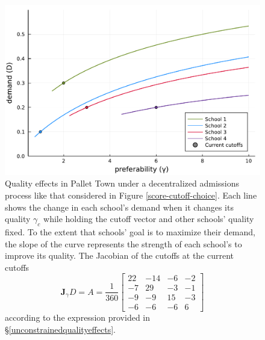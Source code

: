 \documentclass[12pt]{article}
\theoremstyle{definition}
\begin{document}
\begin{figure}
\begin{center}\includegraphics[width=\linewidth, ]{plots/vary-gamma-demand.pdf}\end{center}
\captionsetup{singlelinecheck=off}
    \caption[.]{Quality effects in Pallet Town under a decentralized admissions process like that considered in Figure \ref{score-cutoff-choice}. Each line shows the change in each school’s demand when it changes its quality $\gamma_c$ while holding the cutoff vector and other schools’ quality fixed. To the extent that schools’ goal is to maximize their demand, the slope of the curve represents the strength of each school’s to improve its quality. The Jacobian of the cutoffs at the current cutoffs
    \begin{equation*}
    \mathbf{J}_\gamma D = A = \frac{1}{360}
    \begin{bmatrix}
22 & -14 & -6&  -2\\
 -7   &29  &-3  &-1\\
 -9   &-9  &15  &-3\\
 -6   &-6&  -6  & 6
    \end{bmatrix}
    \end{equation*} 
    according to the expression provided in \S\ref{unconstrainedqualityeffects}. }
\label{vary-gamma-demand}
\end{figure}
\end{document}
